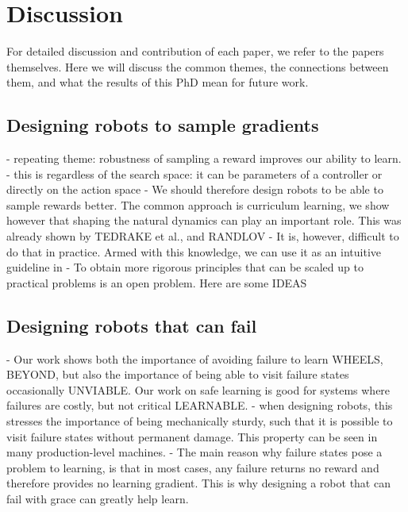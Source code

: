 
\chapter{Discussion}

For detailed discussion and contribution of each paper, we refer to the papers themselves. Here we will discuss the common themes, the connections between them, and what the results of this PhD mean for future work.

\section{Designing robots to sample gradients}
- repeating theme: robustness of sampling a reward improves our ability to learn. 
- this is regardless of the search space: it can be parameters of a controller or directly on the action space
- We should therefore design robots to be able to sample rewards better. The common approach is curriculum learning, we show however that shaping the natural dynamics can play an important role. This was already shown by TEDRAKE et al., and RANDLOV
- It is, however, difficult to do that in practice. Armed with this knowledge, we can use it as an intuitive guideline in 
- To obtain more rigorous principles that can be scaled up to practical problems is an open problem. Here are some IDEAS

\section{Designing robots that can fail}

- Our work shows both the importance of avoiding failure to learn WHEELS, BEYOND, but also the importance of being able to visit failure states occasionally UNVIABLE. Our work on safe learning is good for systems where failures are costly, but not critical LEARNABLE.
- when designing robots, this stresses the importance of being mechanically sturdy, such that it is possible to visit failure states without permanent damage. This property can be seen in many production-level machines.
- The main reason why failure states pose a problem to learning, is that in most cases, any failure returns no reward and therefore provides no learning gradient. This is why designing a robot that can fail with grace can greatly help learn.

